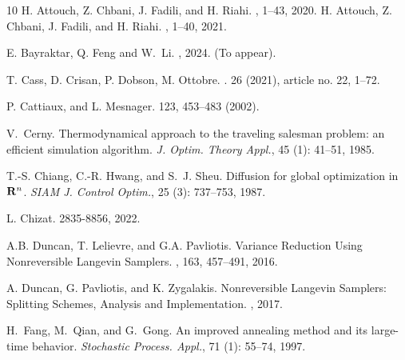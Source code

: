 \documentclass[11pt,reqno]{amsart}
\begin{document}
\begin{thebibliography}{10}
H. Attouch, Z. Chbani, J. Fadili, and H. Riahi.
, 1–43, 2020.
H. Attouch, Z. Chbani, J. Fadili, and H. Riahi.
, 1–40, 2021.

E. Bayraktar, Q. Feng and W.~Li.
, 2024. (To appear).


T. Cass, D. Crisan, P. Dobson, M. Ottobre.
.
 26 (2021), article no. 22, 1–72.

P. Cattiaux, and L. Mesnager.
 123, 453–483 (2002).


V.~Cerny.
\newblock Thermodynamical approach to the traveling salesman problem: an
  efficient simulation algorithm.
\newblock \emph{J. Optim. Theory Appl.}, 45 (1): 41--51,
  1985.

  
T.-S. Chiang, C.-R. Hwang, and S.~J. Sheu.
\newblock Diffusion for global optimization in {${\bf R}^n$}.
\newblock \emph{SIAM J. Control Optim.}, 25 (3): 737--753,
  1987.
  
L. Chizat. 
 2835-8856, 2022.

A.B. Duncan, T. Lelievre, and G.A. Pavliotis.
\newblock Variance Reduction Using Nonreversible Langevin Samplers. 
, 163, 457–491, 2016. 

A. Duncan, G. Pavliotis, and K. Zygalakis.
\newblock Nonreversible Langevin Samplers: Splitting Schemes, Analysis and Implementation. 
, 2017.

H.~Fang, M.~Qian, and G.~Gong.
\newblock An improved annealing method and its large-time behavior.
\newblock \emph{Stochastic Process. Appl.}, 71 (1): 55--74,
  1997.


\end{thebibliography}
\end{document}
